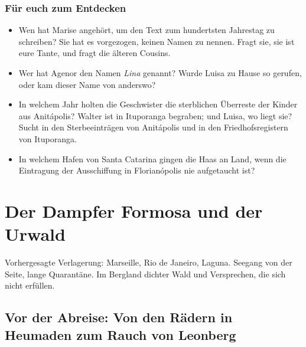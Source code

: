 \documentclass[
  ngerman,
  11pt,
  openany]{book}
\providecommand{\tightlist}{%
  \setlength{\itemsep}{0pt}\setlength{\parskip}{0pt}}
\newenvironment{boletim}{\begin{center}\begin{minipage}{0.85\linewidth}\small\itshape}{\end{minipage}\end{center}}
\begin{document}
\section{Für euch zum Entdecken}\label{fuxfcr-euch-zum-entdecken-2}

\begin{itemize}
\tightlist
\item
  Wen hat Marise angehört, um den Text zum hundertsten Jahrestag zu
  schreiben? Sie hat es vorgezogen, keinen Namen zu nennen. Fragt sie,
  sie ist eure Tante, und fragt die älteren Cousins.
\item
  Wer hat Agenor den Namen \emph{Lina} genannt? Wurde Luisa zu Hause so
  gerufen, oder kam dieser Name von anderswo?
\item
  In welchem Jahr holten die Geschwister die sterblichen Überreste der
  Kinder aus Anitápolis? Walter ist in Ituporanga begraben; und Luisa,
  wo liegt sie? Sucht in den Sterbeeinträgen von Anitápolis und in den
  Friedhofsregistern von Ituporanga.
\item
  In welchem Hafen von Santa Catarina gingen die Haas an Land, wenn die
  Eintragung der Ausschiffung in Florianópolis nie aufgetaucht ist?
\end{itemize}

\part{Der Dampfer Formosa und der
Urwald}\label{der-dampfer-formosa-und-der-urwald}

\begin{boletim}

Vorhergesagte Verlagerung: Marseille, Rio de Janeiro, Laguna. Seegang
von der Seite, lange Quarantäne. Im Bergland dichter Wald und
Versprechen, die sich nicht erfüllen.

\end{boletim}

\chapter{Vor der Abreise: Von den Rädern in Heumaden zum Rauch von
Leonberg}\label{cap-4}
\end{document}
